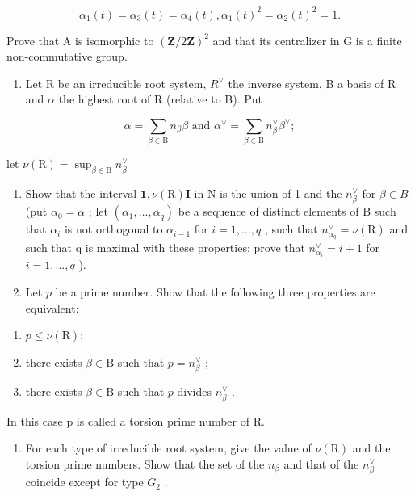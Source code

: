 \begin{enumerate}
\[
\alpha_ {1} (t) = \alpha_ {3} (t) = \alpha_ {4} (t), \alpha_ {1} (t) ^ {2} = \alpha_ {2} (t) ^ {2} = 1.
\]

Prove that A is isomorphic to \((\mathbf{Z}/2\mathbf{Z})^{2}\) and that its centralizer in G is a finite non-commutative group.

\begin{enumerate}
\def\labelenumi{\arabic{enumi})}
\setcounter{enumi}{8}
\tightlist
\item
  Let R be an irreducible root system, \(R^{\vee}\) the inverse system, B a basis of R and \(\alpha\) the highest root of R (relative to B). Put
\end{enumerate}

\[
\alpha = \sum_ {\beta \in \mathrm{B}} n _ {\beta} \beta \text { and } \alpha^ {\vee} = \sum_ {\beta \in \mathrm{B}} n _ {\beta} ^ {\vee} \beta^ {\vee};
\]

let \(\nu (\mathrm{R}) = \sup_{\beta \in \mathrm{B}}n_{\beta}^{\vee}\)

\begin{enumerate}
\def\labelenumi{\alph{enumi})}
\item
  Show that the interval \(\mathbf{1},\nu(\mathrm{R})\mathbf{I}\) in N is the union of 1 and the \(n_{\beta}^{\vee}\) for \(\beta\in B\) (put \(\alpha_{0}=\alpha\) ; let \((\alpha_{1},\ldots,\alpha_{q})\) be a sequence of distinct elements of B such that \(\alpha_{i}\) is not orthogonal to \(\alpha_{i-1}\) for \(i=1,\ldots,q\) , such that \(n_{\alpha_{q}}^{\vee}=\nu(\mathrm{R})\) and such that q is maximal with these properties; prove that \(n_{\alpha_{i}}^{\vee}=i+1\) for \(i=1,\ldots,q\) ).
\item
  Let \(p\) be a prime number. Show that the following three properties are equivalent:
\end{enumerate}

\begin{enumerate}
\def\labelenumi{(\roman{enumi})}
\item
  \(p \leq \nu(\mathrm{R});\)
\item
  there exists \(\beta \in \mathrm{B}\) such that \(p = n_{\beta}^{\vee}\) ;
\item
  there exists \(\beta \in \mathrm{B}\) such that \(p\) divides \(n_{\beta}^{\vee}\) .
\end{enumerate}

In this case p is called a torsion prime number of R.

\begin{enumerate}
\def\labelenumi{\alph{enumi})}
\setcounter{enumi}{2}
\tightlist
\item
  For each type of irreducible root system, give the value of \(\nu(\mathrm{R})\) and the torsion prime numbers. Show that the set of the \(n_{\beta}\) and that of the \(n_{\beta}^{\vee}\) coincide except for type \(G_{2}\) .
\end{enumerate}


\end{enumerate}
